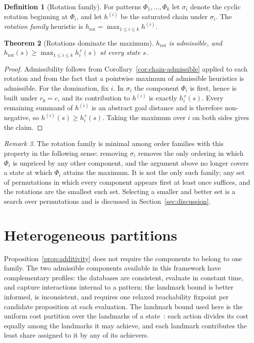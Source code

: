 \documentclass[10pt,twocolumn,a4paper]{article}
\theoremstyle{plain}
\newtheorem{theorem}{Theorem}
\theoremstyle{definition}
\newtheorem{definition}[theorem]{Definition}
\theoremstyle{remark}
\newtheorem{remark}[theorem]{Remark}
\begin{document}
\begin{definition}[Rotation family]
\label{def:rotations}
For patterns $\Phi_1, \dots, \Phi_k$ let $\sigma_i$ denote the cyclic rotation
beginning at $\Phi_i$, and let $h^{(i)}$ be the saturated chain under
$\sigma_i$. The \emph{rotation family} heuristic is
$h_{\mathrm{rot}} = \max_{1 \le i \le k} h^{(i)}$.
\end{definition}

\begin{theorem}[Rotations dominate the maximum]
\label{thm:rotations}
$h_{\mathrm{rot}}$ is admissible, and
$h_{\mathrm{rot}}(s) \ge \max_{1 \le i \le k} h_i^{\,c}(s)$ at every state $s$.
\end{theorem}

\begin{proof}
Admissibility follows from Corollary~\ref{cor:chain-admissible} applied to each
rotation and from the fact that a pointwise maximum of admissible heuristics is
admissible. For the domination, fix $i$. In $\sigma_i$ the component $\Phi_i$
is first, hence is built under $r_0 = c$, and its contribution to $h^{(i)}$ is
exactly $h_i^{\,c}(s)$. Every remaining summand of $h^{(i)}$ is an abstract
goal distance and is therefore non-negative, so
$h^{(i)}(s) \ge h_i^{\,c}(s)$. Taking the maximum over $i$ on both sides gives
the claim.
\end{proof}

\begin{remark}
\label{rem:minimality}
The rotation family is minimal among order families with this property in the
following sense: removing $\sigma_i$ removes the only ordering in which
$\Phi_i$ is unpriced by any other component, and the argument above no longer
covers a state at which $\Phi_i$ attains the maximum. It is not the only such
family; any set of permutations in which every component appears first at least
once suffices, and the rotations are the smallest such set. Selecting a smaller
and better set is a search over permutations and is discussed in
Section~\ref{sec:discussion}.
\end{remark}

\section{Heterogeneous partitions}
\label{sec:mixed}

Proposition~\ref{prop:additivity} does not require the components to belong to
one family. The two admissible components available in this framework have
complementary profiles: the databases are consistent, evaluate in constant
time, and capture interactions internal to a pattern; the landmark bound is
better informed, is inconsistent, and requires one relaxed reachability
fixpoint per candidate proposition at each evaluation. The landmark bound used
here is the uniform cost partition over the landmarks of a
state~\cite{karpas2009}: each action divides its cost equally among the
landmarks it may achieve, and each landmark contributes the least share
assigned to it by any of its achievers.
\end{document}

